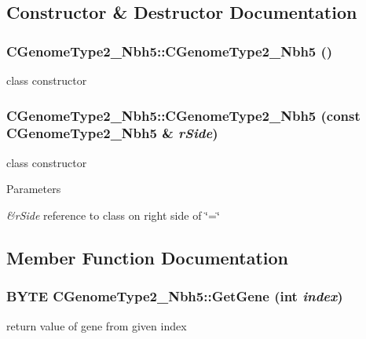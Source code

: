 \subsection{Constructor \& Destructor Documentation}
\hypertarget{classCGenomeType2__Nbh5_a0ccd012da09e8edaea35f9f3b94504c8}{
\subsubsection[{CGenomeType2\_\-Nbh5}]{\setlength{\rightskip}{0pt plus 5cm}CGenomeType2\_\-Nbh5::CGenomeType2\_\-Nbh5 ()}}
\label{classCGenomeType2__Nbh5_a0ccd012da09e8edaea35f9f3b94504c8}
class constructor \hypertarget{classCGenomeType2__Nbh5_a4d69266c619a26feddee962c8b4b637b}{
\subsubsection[{CGenomeType2\_\-Nbh5}]{\setlength{\rightskip}{0pt plus 5cm}CGenomeType2\_\-Nbh5::CGenomeType2\_\-Nbh5 (const {\bf CGenomeType2\_\-Nbh5} \& {\em rSide})}}
\label{classCGenomeType2__Nbh5_a4d69266c619a26feddee962c8b4b637b}
class constructor


\begin{DoxyParams}{Parameters}
\item[{\em \&rSide}]reference to class on right side of \char`\"{}=\char`\"{} \end{DoxyParams}


\subsection{Member Function Documentation}
\hypertarget{classCGenomeType2__Nbh5_ad50ac399c0577cee5c0f128ad058a2b7}{
\subsubsection[{GetGene}]{\setlength{\rightskip}{0pt plus 5cm}BYTE CGenomeType2\_\-Nbh5::GetGene (int {\em index})}}
\label{classCGenomeType2__Nbh5_ad50ac399c0577cee5c0f128ad058a2b7}
return value of gene from given index


